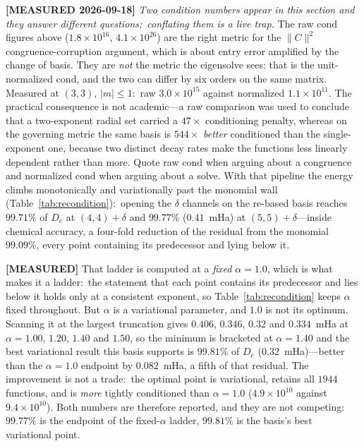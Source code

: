 \documentclass[aps,pra,twocolumn,superscriptaddress,longbibliography]{revtex4-2}
\newcommand{\gvq}[2]{#2}
\begin{document}
\textbf{[MEASURED 2026-09-18]} \emph{Two condition numbers appear in this
section and they answer different questions;\ conflating them is a live
trap.} The raw $\mathrm{cond}$ figures above ($1.8\times10^{16}$,
$4.1\times10^{26}$) are the right metric for the $\|C\|^2$
congruence-corruption argument, which is about entry error amplified by
the change of basis. They are \emph{not} the metric the eigensolve sees:
that is the unit-normalized $\mathrm{cond}$, and the two can differ by
six orders on the same matrix. Measured at $(3,3)$, $|m|\le1$:\ raw
$3.0\times10^{15}$ against normalized $1.1\times10^{11}$. The practical
consequence is not academic---a raw comparison was used to conclude that
a two-exponent radial set carried a $47\times$ conditioning penalty,
whereas on the governing metric the same basis is $544\times$
\emph{better} conditioned than the single-exponent one, because two
distinct decay rates make the functions less linearly dependent rather
than more. Quote raw $\mathrm{cond}$ when arguing about a congruence and
normalized $\mathrm{cond}$ when arguing about a solve.  With that pipeline the energy climbs monotonically and
variationally past the monomial wall (Table~\ref{tab:recondition}):\
opening the $\delta$ channels on the re-based basis reaches $99.71\%$ of
$D_e$ at $(4,4)+\delta$ and $\gvq{p12_rebased_de_pct}{99.77}\%$
($\gvq{p12_rebased_err_mha}{0.41}$~mHa) at $(5,5)+\delta$---inside
chemical accuracy, a four-fold reduction of the residual from the
monomial $99.09\%$, every point containing its predecessor and lying
below it.

\textbf{[MEASURED]} That ladder is computed at a \emph{fixed} $\alpha = 1.0$,
which is what makes it a ladder:\ the statement that each point contains its
predecessor and lies below it holds only at a consistent exponent, so
Table~\ref{tab:recondition} keeps $\alpha$ fixed throughout.  But $\alpha$ is a
variational parameter, and $1.0$ is not its optimum.  Scanning it at the largest
truncation gives $0.406$, $0.346$, $\gvq{p12_rebased_err_mha_aopt}{0.32}$ and
$0.334$~mHa at $\alpha = 1.00$, $1.20$,
$\gvq{p12_rebased_alpha_opt}{1.40}$ and $1.50$, so the minimum is bracketed at
$\alpha = \gvq{p12_rebased_alpha_opt}{1.40}$ and the best variational result this
basis supports is $\gvq{p12_rebased_de_pct_aopt}{99.81}\%$ of $D_e$
($\gvq{p12_rebased_err_mha_aopt}{0.32}$~mHa)---better than the $\alpha = 1.0$
endpoint by $0.082$~mHa, a fifth of that residual.  The improvement is not a
trade:\ the optimal point is variational, retains all $1944$ functions, and is
\emph{more} tightly conditioned than $\alpha = 1.0$ ($4.9\times10^{10}$ against
$9.4\times10^{10}$).  Both numbers are therefore reported, and they are not
competing:\ $99.77\%$ is the endpoint of the fixed-$\alpha$ ladder, $99.81\%$ is
the basis's best variational point.
\end{document}
